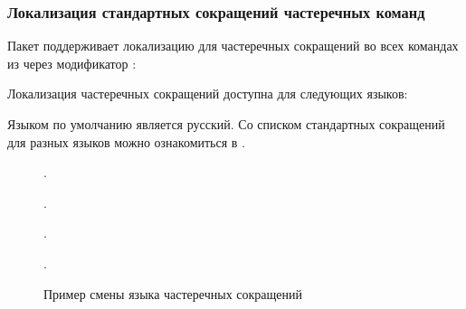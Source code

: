 \subsubsection{Локализация стандартных сокращений частеречных команд}

Пакет  поддерживает локализацию для частеречных сокращений во всех командах из
 через модификатор \manModifier[rsSetLanguage]:
\ExplSyntaxOn
\begin{signature}
\end{signature}
\ExplSyntaxOff


Локализация частеречных сокращений доступна для следующих языков:

Языком по умолчанию является русский. Со списком стандартных сокращений для разных языков
можно ознакомиться в .

\begin{figure}[H]
    \centering
    \begin{minipage}[c]{0.5\textwidth}
        \begin{Latexcode}
             
             
            .

             
             
             .
        \end{Latexcode}
    \end{minipage}
    \hfill
    \begin{minipage}[c]{0.4\textwidth}
        \small
           .
        \vspace*{\baselineskip}

          
          .
    \end{minipage}

    \caption{Пример смены языка частеречных сокращений}
\end{figure}